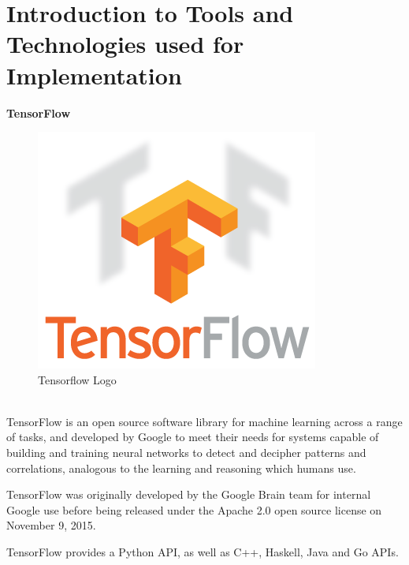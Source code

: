 \section{Introduction to Tools and Technologies used for Implementation}
\textbf{{\Large TensorFlow}}
\begin{figure}[h]
	\centering\includegraphics[scale=0.75]{images/tensorflow_logo.png}
	\caption{Tensorflow Logo}
\end{figure}\\TensorFlow is an open source software library for machine learning across a range of tasks, and developed by Google to meet their needs for systems capable of building and training neural networks to detect and decipher patterns and correlations, analogous to the learning and reasoning which humans use.

TensorFlow was originally developed by the Google Brain team for internal Google use before being released under the Apache 2.0 open source license on November 9, 2015.

TensorFlow provides a Python API, as well as C++, Haskell, Java and Go APIs.

